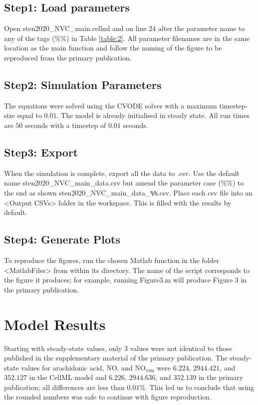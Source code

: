 \documentclass[fleqn,10pt]{physiome}
\begin{document}
\subsection{Step1: Load parameters} 
Open sten2020\_NVC\_main.cellml and on line $24$ alter the parameter name to any of the tags (\%\%) in Table \ref{table:2}. All parameter filenames are in the same location as the main function and follow the naming of the figure to be reproduced from the primary publication.
\subsection{Step2: Simulation Parameters} 
The equations were solved using the CVODE solver with a maximum timestep-size equal to $0.01$. The model is already initialised in steady state. All run times are $50$ seconds with a timestep of $0.01$ seconds. 

\subsection{Step3: Export} 
When the simulation is complete, export all the data to .csv. Use the default name sten2020\_NVC\_main\_data.csv but amend the parameter case (\%\%) to the end as shown sten2020\_NVC\_main\_data\_\verb|%%|.csv. Place each csv file into an <Output CSVs> folder in the workspace. This is filled with the results by default. 

\subsection{Step4: Generate Plots} 
To reproduce the figures, run the chosen Matlab function in the folder <MatlabFiles> from within its directory. The name of the script corresponds to the figure it produces; for example, running Figure3.m will produce Figure $3$ in the primary publication. 

\section{Model Results}

Starting with steady-state values, only $3$ values were not identical to those published in the supplementary material of the primary publication. The steady-state values for arachidonic acid, NO, and NO$_\mathrm{vsm}$ were $6.224$, $2944.421$, and $352.127$ in the CellML model and $6.226$, $2944.636$, and $352.139$ in the primary publication; all differences are less than $0.01$\%. This led us to conclude that using the rounded numbers was safe to continue with figure reproduction.
\end{document}
